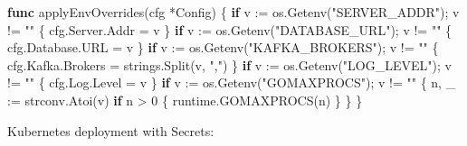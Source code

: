\documentclass[
]{article}
\newenvironment{Shaded}{}{}
\newcommand{\ControlFlowTok}[1]{\textcolor[rgb]{0.00,0.44,0.13}{\textbf{#1}}}
\newcommand{\DecValTok}[1]{\textcolor[rgb]{0.25,0.63,0.44}{#1}}
\newcommand{\KeywordTok}[1]{\textcolor[rgb]{0.00,0.44,0.13}{\textbf{#1}}}
\newcommand{\NormalTok}[1]{#1}
\newcommand{\OperatorTok}[1]{\textcolor[rgb]{0.40,0.40,0.40}{#1}}
\newcommand{\StringTok}[1]{\textcolor[rgb]{0.25,0.44,0.63}{#1}}
\begin{document}
\begin{Shaded}
\begin{Highlighting}[]
\KeywordTok{func}\NormalTok{ applyEnvOverrides}\OperatorTok{(}\NormalTok{cfg }\OperatorTok{*}\NormalTok{Config}\OperatorTok{)} \OperatorTok{\{}
    \ControlFlowTok{if}\NormalTok{ v }\OperatorTok{:=}\NormalTok{ os}\OperatorTok{.}\NormalTok{Getenv}\OperatorTok{(}\StringTok{"SERVER\_ADDR"}\OperatorTok{);}\NormalTok{ v }\OperatorTok{!=} \StringTok{""} \OperatorTok{\{}
\NormalTok{        cfg}\OperatorTok{.}\NormalTok{Server}\OperatorTok{.}\NormalTok{Addr }\OperatorTok{=}\NormalTok{ v}
    \OperatorTok{\}}
    \ControlFlowTok{if}\NormalTok{ v }\OperatorTok{:=}\NormalTok{ os}\OperatorTok{.}\NormalTok{Getenv}\OperatorTok{(}\StringTok{"DATABASE\_URL"}\OperatorTok{);}\NormalTok{ v }\OperatorTok{!=} \StringTok{""} \OperatorTok{\{}
\NormalTok{        cfg}\OperatorTok{.}\NormalTok{Database}\OperatorTok{.}\NormalTok{URL }\OperatorTok{=}\NormalTok{ v}
    \OperatorTok{\}}
    \ControlFlowTok{if}\NormalTok{ v }\OperatorTok{:=}\NormalTok{ os}\OperatorTok{.}\NormalTok{Getenv}\OperatorTok{(}\StringTok{"KAFKA\_BROKERS"}\OperatorTok{);}\NormalTok{ v }\OperatorTok{!=} \StringTok{""} \OperatorTok{\{}
\NormalTok{        cfg}\OperatorTok{.}\NormalTok{Kafka}\OperatorTok{.}\NormalTok{Brokers }\OperatorTok{=}\NormalTok{ strings}\OperatorTok{.}\NormalTok{Split}\OperatorTok{(}\NormalTok{v}\OperatorTok{,} \StringTok{","}\OperatorTok{)}
    \OperatorTok{\}}
    \ControlFlowTok{if}\NormalTok{ v }\OperatorTok{:=}\NormalTok{ os}\OperatorTok{.}\NormalTok{Getenv}\OperatorTok{(}\StringTok{"LOG\_LEVEL"}\OperatorTok{);}\NormalTok{ v }\OperatorTok{!=} \StringTok{""} \OperatorTok{\{}
\NormalTok{        cfg}\OperatorTok{.}\NormalTok{Log}\OperatorTok{.}\NormalTok{Level }\OperatorTok{=}\NormalTok{ v}
    \OperatorTok{\}}
    \ControlFlowTok{if}\NormalTok{ v }\OperatorTok{:=}\NormalTok{ os}\OperatorTok{.}\NormalTok{Getenv}\OperatorTok{(}\StringTok{"GOMAXPROCS"}\OperatorTok{);}\NormalTok{ v }\OperatorTok{!=} \StringTok{""} \OperatorTok{\{}
\NormalTok{        n}\OperatorTok{,}\NormalTok{ \_ }\OperatorTok{:=}\NormalTok{ strconv}\OperatorTok{.}\NormalTok{Atoi}\OperatorTok{(}\NormalTok{v}\OperatorTok{)}
        \ControlFlowTok{if}\NormalTok{ n }\OperatorTok{\textgreater{}} \DecValTok{0} \OperatorTok{\{}
\NormalTok{            runtime}\OperatorTok{.}\NormalTok{GOMAXPROCS}\OperatorTok{(}\NormalTok{n}\OperatorTok{)}
        \OperatorTok{\}}
    \OperatorTok{\}}
\OperatorTok{\}}
\end{Highlighting}
\end{Shaded}

Kubernetes deployment with Secrets:
\end{document}
